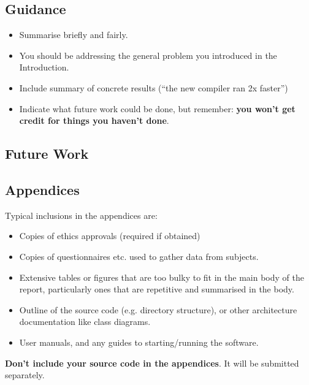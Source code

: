 \documentclass{l4proj}
\begin{document}
\section{Guidance}
\begin{itemize}
    \item
        Summarise briefly and fairly.
    \item
        You should be addressing the general problem you introduced in the
        Introduction.        
    \item
        Include summary of concrete results (``the new compiler ran 2x
        faster'')
    \item
        Indicate what future work could be done, but remember: \textbf{you
        won't get credit for things you haven't done}.
\end{itemize}

\section{Future Work}

%
% 

\begin{appendices}

\chapter{Appendices}

Typical inclusions in the appendices are:

\begin{itemize}
\item
  Copies of ethics approvals (required if obtained)
\item
  Copies of questionnaires etc. used to gather data from subjects.
\item
  Extensive tables or figures that are too bulky to fit in the main body of
  the report, particularly ones that are repetitive and summarised in the body.

\item Outline of the source code (e.g. directory structure), or other architecture documentation like class diagrams.

\item User manuals, and any guides to starting/running the software.

\end{itemize}

\textbf{Don't include your source code in the appendices}. It will be
submitted separately.

\end{appendices}
\end{document}

